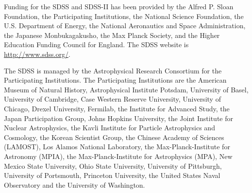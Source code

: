 \documentclass[useAMS,usenatbib]{mn2e}
\begin{document}
Funding for the SDSS and SDSS-II has been provided by the Alfred P. Sloan
Foundation, the Participating Institutions, the National Science Foundation,
the U.S. Department of Energy, the National Aeronautics and Space
Administration, the Japanese Monbukagakusho, the Max Planck Society, and the
Higher Education Funding Council for England. The SDSS website is
\url{http://www.sdss.org/}. 

The SDSS is managed by the Astrophysical Research Consortium for the
Participating Institutions. The Participating Institutions are the American
Museum of Natural History, Astrophysical Institute Potsdam, University of
Basel, University of Cambridge, Case Western Reserve University, University of
Chicago, Drexel University, Fermilab, the Institute for Advanced Study, the
Japan Participation Group, Johns Hopkins University, the Joint Institute for
Nuclear Astrophysics, the Kavli Institute for Particle Astrophysics and
Cosmology, the Korean Scientist Group, the Chinese Academy of Sciences
(LAMOST), Los Alamos National Laboratory, the Max-Planck-Institute for
Astronomy (MPIA), the Max-Planck-Institute for Astrophysics (MPA), New Mexico
State University, Ohio State University, University of Pittsburgh, University
of Portsmouth, Princeton University, the United States Naval Observatory and
the University of Washington. 


  
\end{document}
